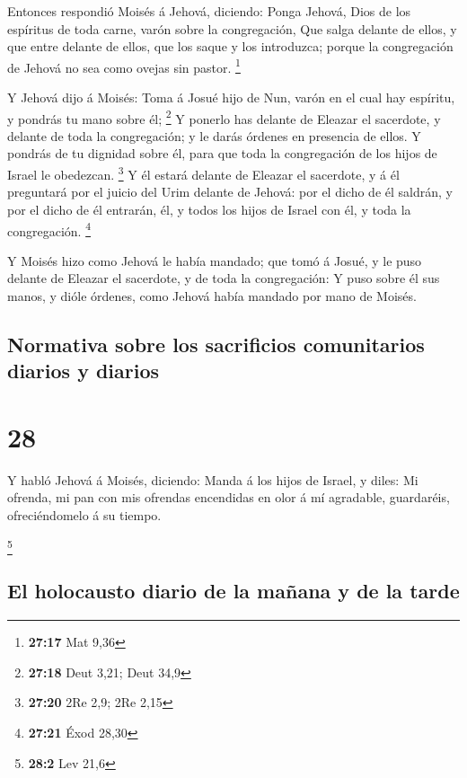  Entonces respondió Moisés á Jehová, diciendo:
 Ponga Jehová, Dios de los espíritus de toda carne, varón
sobre la congregación,  Que salga delante de ellos, y que
entre delante de ellos, que los saque y los introduzca; porque la
congregación de Jehová no sea como ovejas sin pastor. \footnote{\textbf{27:17}
  Mat 9,36}

 Y Jehová dijo á Moisés: Toma á Josué hijo de Nun, varón
en el cual hay espíritu, y pondrás tu mano sobre él; \footnote{\textbf{27:18}
  Deut 3,21; Deut 34,9}  Y ponerlo has delante de Eleazar
el sacerdote, y delante de toda la congregación; y le darás órdenes en
presencia de ellos.  Y pondrás de tu dignidad sobre él,
para que toda la congregación de los hijos de Israel le obedezcan.
\footnote{\textbf{27:20} 2Re 2,9; 2Re 2,15}  Y él estará
delante de Eleazar el sacerdote, y á él preguntará por el juicio del
Urim delante de Jehová: por el dicho de él saldrán, y por el dicho de él
entrarán, él, y todos los hijos de Israel con él, y toda la
congregación. \footnote{\textbf{27:21} Éxod 28,30}

 Y Moisés hizo como Jehová le había mandado; que tomó á
Josué, y le puso delante de Eleazar el sacerdote, y de toda la
congregación:  Y puso sobre él sus manos, y dióle
órdenes, como Jehová había mandado por mano de Moisés.

\hypertarget{normativa-sobre-los-sacrificios-comunitarios-diarios-y-diarios}{%
\subsection{Normativa sobre los sacrificios comunitarios diarios y
diarios}\label{normativa-sobre-los-sacrificios-comunitarios-diarios-y-diarios}}

\hypertarget{section-27}{%
\section{28}\label{section-27}}

 Y habló Jehová á Moisés, diciendo:  Manda á
los hijos de Israel, y diles: Mi ofrenda, mi pan con mis ofrendas
encendidas en olor á mí agradable, guardaréis, ofreciéndomelo á su
tiempo.

\footnote{\textbf{28:2} Lev 21,6}

\hypertarget{el-holocausto-diario-de-la-mauxf1ana-y-de-la-tarde}{%
\subsection{El holocausto diario de la mañana y de la
tarde}\label{el-holocausto-diario-de-la-mauxf1ana-y-de-la-tarde}}

